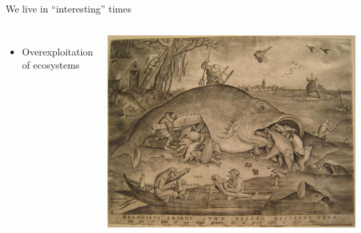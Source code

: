 \documentclass[xcolor={usenames,x11names},compress]{beamer}
\renewcommand{\(}{\begin{columns}}
\renewcommand{\)}{\end{columns}}
\newcommand{\<}[1]{\begin{column}{#1}}
\renewcommand{\>}{\end{column}}
\begin{document}
\begin{frame}{We live in ``interesting'' times}
\begin{columns}[c]
		\begin{itemize}[<+->]\setlength{\itemindent}{0em}
			\item Overexploitation of ecosystems
		\end{itemize}
  \centering
		\includegraphics[width=.9\textwidth]{Pieter_Fish.jpg}		
\end{columns}

\end{frame}

\end{document}
